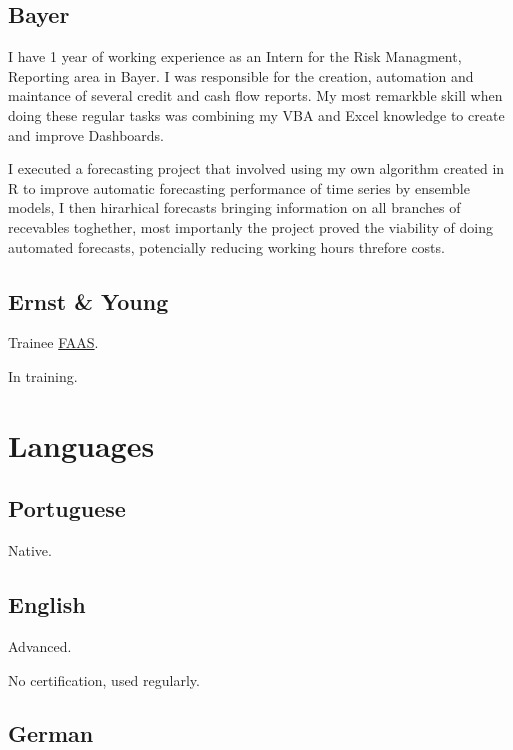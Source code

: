 \documentclass[11pt, a4paper]{awesome-cv}
\begin{document}
\hypertarget{bayer}{%
\subsection{Bayer}\label{bayer}}

I have 1 year of working experience as an Intern for the Risk Managment, Reporting area in Bayer. I was responsible for the creation, automation and maintance of several credit and cash flow reports. My most remarkble skill when doing these regular tasks was combining my VBA and Excel knowledge to create and improve Dashboards.

I executed a forecasting project that involved using my own algorithm created in R to improve automatic forecasting performance of time series by ensemble models, I then hirarhical forecasts bringing information on all branches of recevables toghether, most importanly the project proved the viability of doing automated forecasts, potencially reducing working hours threfore costs.

\hypertarget{ernst-young}{%
\subsection{Ernst \& Young}\label{ernst-young}}

Trainee \href{https://www.ey.com/us/en/services/assurance/financial-accounting-advisory-services}{FAAS}.

In training.

\hypertarget{languages}{%
\section{Languages}\label{languages}}

\hypertarget{portuguese}{%
\subsection{Portuguese}\label{portuguese}}

Native.

\hypertarget{english}{%
\subsection{English}\label{english}}

Advanced.

No certification, used regularly.

\hypertarget{german}{%
\subsection{German}\label{german}}
\end{document}
